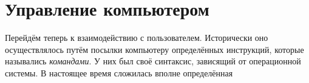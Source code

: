 \section{Управление компьютером}\label{base:introduction:control}
Перейдём теперь к взаимодействию с пользователем. Исторически оно осуществлялось путём посылки компьютеру определённых инструкций, которые назывались \emph{командами}. У них был своё синтаксис, зависящий от операционной системы. В настоящее время сложилась вполне определённая